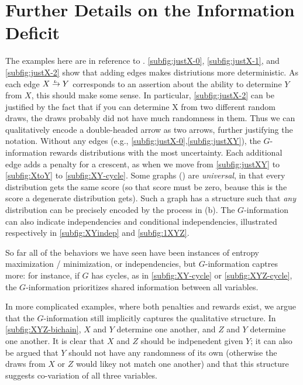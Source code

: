 \documentclass{article}
\theoremstyle{plain}
\theoremstyle{definition}
\theoremstyle{remark}
\newcommand{\ed}[3]{#2
  \overset{\smash{\mskip-5mu\raisebox{-1pt}{$\scriptscriptstyle
        #1$}}}{\rightarrow} #3}
\numberwithin{equation}{section}
\begin{document}
\section{Further Details on the Information Deficit}
\begin{vfull}
The examples here are in reference to .
\ref{subfig:justX-0}, \ref{subfig:justX-1}, and \ref{subfig:justX-2} show that adding edges makes distriutions more deterministic. 
As each edge $\ed LXY$ corresponds to an assertion about the ability to determine $Y$ from $X$, this should make some sense.
In particular, \ref{subfig:justX-2} can be justified by the fact that if you can determine X from two different random draws, the draws probably did not have much randomness in them. Thus we can qualitatively encode a double-headed arrow as two arrows, further justifying the notation.
%	
Without any edges (e.g., \ref{subfig:justX-0},\ref{subfig:justXY}), the $G$-information rewards distributions with the most uncertainty. Each additional edge adds a penalty for a crescent, as when we move from \ref{subfig:justXY} to \ref{subfig:XtoY} to \ref{subfig:XY-cycle}.
%
Some graphs () are \emph{universal}, in that every distribution gets the same score (so that score must be zero, beause this is the score a degenerate distribution gets). Such a graph has a structure such that \emph{any} distribution can be precisely encoded by the process in (b). 
%	
The $G$-information can also indicate independencies and conditional independencies, illustrated respectively in \ref{subfig:XYindep} and \ref{subfig:1XYZ}.

So far all of the behaviors we have seen have been instances of entropy maximization / minimization, or independencies, but $G$-information captres more: for instance, if $G$ has cycles, as in \ref{subfig:XY-cycle} or \ref{subfig:XYZ-cycle}, the $G$-information prioritizes shared information between all variables. 

In more complicated examples, where both penalties and rewards exist, we argue that the $G$-information still implicitly captures the qualitative structure. In \ref{subfig:XYZ-bichain}, $X$ and $Y$ determine one another, and $Z$ and $Y$ determine one another. It is clear that $X$ and $Z$ should be indpenedent given $Y$; it can also be argued that $Y$ should not have any randomness of its own (otherwise the draws from $X$ or $Z$ would likey not match one another) and that this structure suggests co-variation of all three variables.



\end{vfull}
\end{document}
